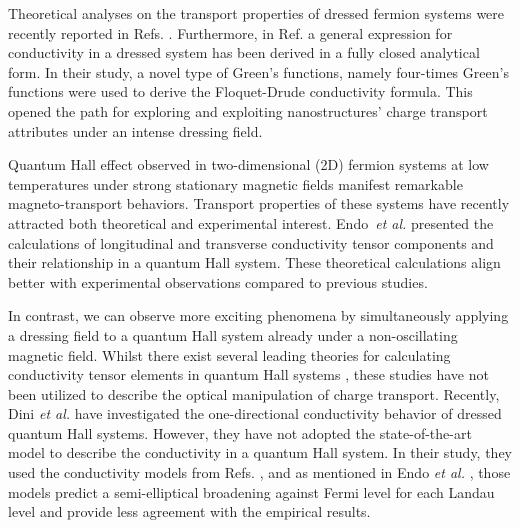 \documentclass[
 reprint,
 amsmath,amssymb,
 aps,
 prb,
]{revtex4-2}
\begin{document}
Theoretical analyses on the transport properties of dressed fermion systems were recently reported in Refs. \cite{kibis14,morina15,wackerl20}.
Furthermore, in Ref. \cite{wackerl20} a general expression for conductivity in a dressed system has been derived in a fully closed analytical form. In their study, a novel type of Green’s functions, namely four-times Green’s functions were used to derive the Floquet-Drude conductivity formula. This opened the path for exploring and exploiting nanostructures' charge transport attributes under an intense dressing field.

Quantum Hall effect \cite{girvin90} observed in two-dimensional (2D) fermion systems at low temperatures under strong stationary magnetic fields manifest remarkable magneto-transport behaviors. Transport properties of these systems have recently attracted both theoretical \cite{ando72,ando74_1,ando74_2,ando74_3,ando74_4,ando82,endo09} and experimental \cite{allerman95,tieke97,pan05} interest.
Endo \textit{et al.} \cite{endo09} presented the calculations of longitudinal and transverse conductivity tensor components and their relationship in a quantum Hall system. These theoretical calculations  align better with experimental observations compared to previous studies.

In contrast, we can observe more exciting phenomena by simultaneously applying a dressing field to a quantum Hall system already under a non-oscillating magnetic field.
Whilst there exist several leading theories for calculating conductivity tensor elements in quantum Hall systems \cite{ando74_1,ando82,endo09}, these studies  have not been utilized to describe the optical manipulation of charge transport.
Recently, Dini \textit{et al.} \cite{dini16} have investigated the one-directional conductivity behavior of dressed quantum Hall systems. However, they have not adopted the state-of-the-art model to describe the conductivity in a quantum Hall system. In their study, they used the conductivity models from Refs. \cite{ando74_1,ando82}, and as mentioned in Endo \textit{et al.} \cite{endo09}, those models predict a semi-elliptical broadening against Fermi level for each Landau level and provide less agreement with the empirical results.
\end{document}
